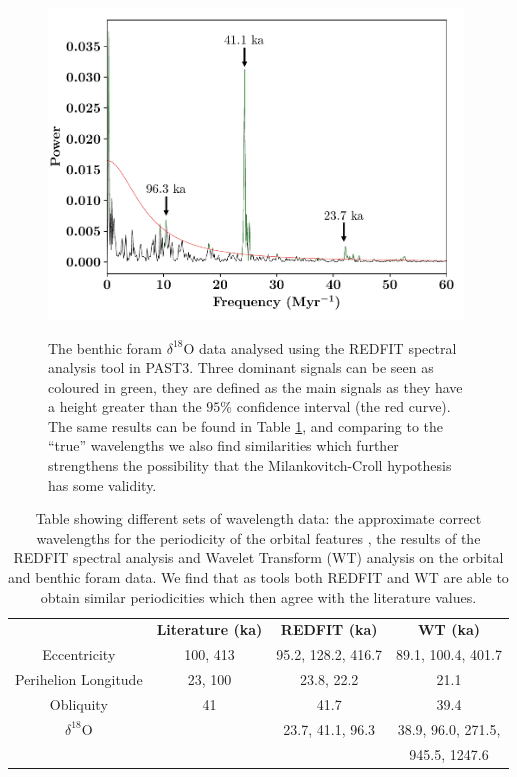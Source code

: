 \documentclass[12pt, onecolumn]{revtex4}    %
\begin{document}
\begin{figure}[!h]
\begin{center}
\includegraphics[width=11cm]{figures/d18O_redfit}
\caption[]{The benthic foram $\delta^{18}$O data analysed using the REDFIT spectral analysis tool in PAST3. Three dominant signals can be seen as coloured in green, they are defined as the main signals as they have a height greater than the $95\%$ confidence interval (the red curve). The same results can be found in Table \ref{table:final_results}, and comparing to the ``true'' wavelengths we also find similarities which further strengthens the possibility that the Milankovitch-Croll hypothesis has some validity.}
\vspace{-3ex}
\label{fig:d18o_redfit}
\end{center}
\end{figure}

\begin{table}[h!]
\centering
\begin{tabular}{c@{\hskip 20pt}c@{\hskip 20pt}c@{\hskip 20pt}c} 
 \hline
  & \textbf{Literature (ka)} &\textbf{REDFIT (ka)} & \textbf{WT (ka)} \\ [0.5ex] 
 Eccentricity & 100, 413 & 95.2, 128.2, 416.7 & 89.1, 100.4,  401.7\\
 Perihelion Longitude & 23, 100 & 23.8, 22.2 & 21.1 \\
 Obliquity & 41 & 41.7 & 39.4 \\
 $\delta^{18}$O & & 23.7, 41.1, 96.3  & 38.9, 96.0, 271.5, \\
 & & & 945.5, 1247.6 \\
 \hline
\end{tabular}
\caption{Table showing different sets of wavelength data: the approximate correct wavelengths for the periodicity of the orbital features \cite{campisano_milankovitch}, the results of the REDFIT spectral analysis and Wavelet Transform (WT) analysis on the orbital and benthic foram data. We find that as tools both REDFIT and WT are able to obtain similar periodicities which then agree with the literature values. }
\vspace{-0.5em}
\label{table:final_results}
\end{table}
\end{document}
